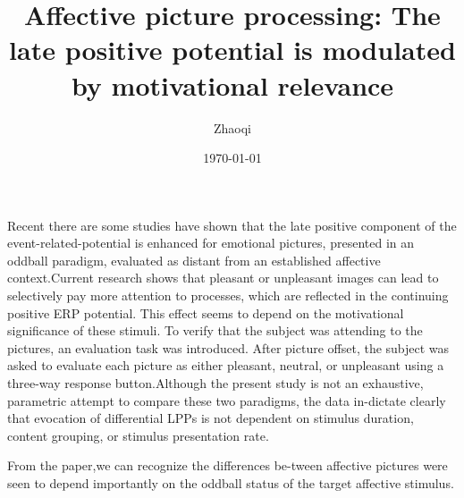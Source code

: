 \documentclass{article}
\author{Zhaoqi}
\date{\today}
\title{Affective picture processing: The late positive potential is modulated by motivational relevance}
\begin{document}
\maketitle
\par Recent there are some studies have shown that the late positive component of the event-related-potential is enhanced for emotional pictures, presented in an oddball paradigm, evaluated as distant from an established affective context.Current research shows that pleasant or unpleasant images can lead to selectively pay more attention to processes, which are reflected in the continuing positive ERP potential. This effect seems to depend on the motivational significance of these stimuli. To verify that the subject was attending to the pictures, an evaluation task was introduced. After picture offset, the subject was asked to evaluate each picture as either pleasant, neutral, or unpleasant using a three-way response button.Although the present study is not an exhaustive, parametric attempt to compare these two paradigms, the data in-dictate clearly that evocation of differential LPPs is not dependent on stimulus duration, content grouping, or stimulus presentation rate.
\par From the paper,we can recognize the differences be-tween affective pictures were seen to depend importantly on the oddball status of the target affective stimulus.
\end{document}
